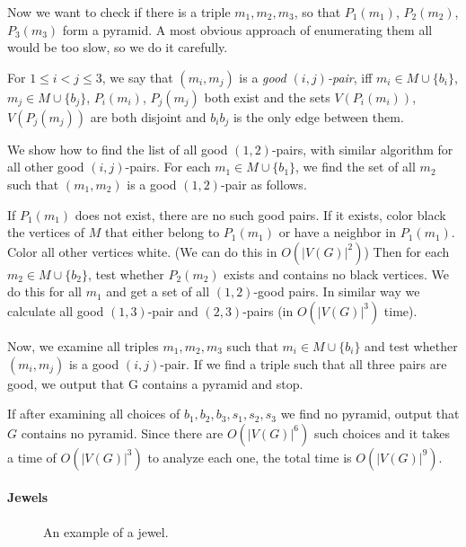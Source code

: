 \documentclass{article}
\begin{document}
Now we want to check if there is a triple $m_1, m_2, m_3$, so that $P_1(m_1)$, $P_2(m_2)$, $P_3(m_3)$ form a pyramid. A most obvious approach of enumerating them all would be too slow, so we do it carefully.

For $1 \leq i < j \leq 3$, we say that $(m_i, m_j)$ is a \emph{good $(i, j)$-pair}, iff $m_i \in M \cup \{b_i\}$, $m_j \in M \cup \{b_j\}$, $P_i(m_i)$, $P_j(m_j)$ both exist and the sets $V(P_i(m_i))$,$V(P_j(m_j))$ are both disjoint and $b_ib_j$ is the only edge between them.

We show how to find the list of all good $(1, 2)$-pairs, with similar algorithm for all other good $(i, j)$-pairs. For each $m_1 \in M \cup \{b_1\}$, we find the set of all $m_2$ such that $(m_1, m_2)$ is a good $(1,2)$-pair as follows.

If $P_1(m_1)$ does not exist, there are no such good pairs. If it exists, color black the vertices of $M$ that either belong to $P_1(m_1)$ or have a neighbor in $P_1(m_1)$. Color all other vertices white. (We can do this in $O(|V(G)|^2)$) Then for each $m_2 \in M \cup \{b_2\}$, test whether $P_2(m_2)$ exists and contains no black vertices. We do this for all $m_1$ and get a set of all $(1,2)$-good pairs. In similar way we calculate all good $(1,3)$-pair and $(2,3)$-pairs (in $O(|V(G)|^3)$ time).

Now, we examine all triples $m_1, m_2, m_3$ such that $m_i \in M \cup \{b_i\}$ and test whether $(m_i, m_j)$ is a good $(i, j)$-pair. If we find a triple such that all three pairs are good, we output that G contains a pyramid and stop.

If after examining all choices of $b_1, b_2, b_3, s_1, s_2, s_3$ we find no pyramid, output that $G$ contains no pyramid. Since there are $O(|V(G)|^6)$ such choices and it takes a time of $O(|V(G)|^3)$ to analyze each one, the total time is $O(|V(G)|^9)$.



\paragraph{Jewels}

\begin{wrapfigure}{r}{0.35\textwidth}
	
	\caption{An example of a jewel.}
	\vspace{-1.5cm}
\end{wrapfigure}
\end{document}
